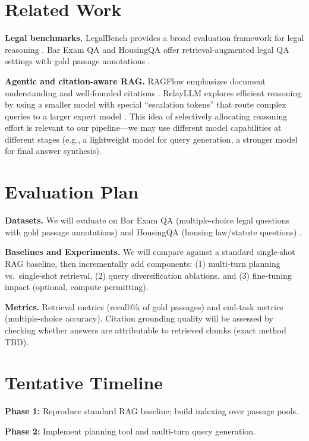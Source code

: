 \documentclass{article}
\begin{document}
\section{Related Work}

\textbf{Legal benchmarks.} LegalBench provides a broad evaluation framework for legal reasoning \cite{guha2023legalbench}. Bar Exam QA and HousingQA offer retrieval-augmented legal QA settings with gold passage annotations \cite{zheng2025legalretrievalbench}.

\textbf{Agentic and citation-aware RAG.} RAGFlow emphasizes document understanding and well-founded citations \cite{ragflow}. RelayLLM explores efficient reasoning by using a smaller model with special ``escalation tokens'' that route complex queries to a larger expert model \cite{huang2026relayllm}. This idea of selectively allocating reasoning effort is relevant to our pipeline---we may use different model capabilities at different stages (e.g., a lightweight model for query generation, a stronger model for final answer synthesis).

\section{Evaluation Plan}

\textbf{Datasets.} We will evaluate on Bar Exam QA (multiple-choice legal questions with gold passage annotations) \cite{barexamqa} and HousingQA (housing law/statute questions) \cite{housingqa}.

\textbf{Baselines and Experiments.} We will compare against a standard single-shot RAG baseline, then incrementally add components: (1) multi-turn planning vs.\ single-shot retrieval, (2) query diversification ablations, and (3) fine-tuning impact (optional, compute permitting).

\textbf{Metrics.} Retrieval metrics (recall@k of gold passages) and end-task metrics (multiple-choice accuracy). Citation grounding quality will be assessed by checking whether answers are attributable to retrieved chunks (exact method TBD).

\section{Tentative Timeline}

\textbf{Phase 1:} Reproduce standard RAG baseline; build indexing over passage pools. 

\textbf{Phase 2:} Implement planning tool and multi-turn query generation. 
\end{document}
